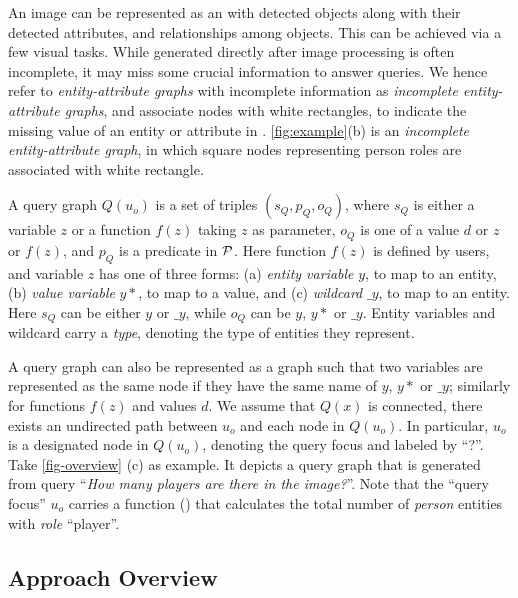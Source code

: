 An image can be represented as an  with detected objects along with their detected attributes, and relationships among objects. This can be achieved via a few visual tasks. While  generated directly after image processing is often incomplete, \ie it may miss some crucial information to answer queries. We hence refer to {\em entity-attribute graphs} with incomplete information as {\em incomplete entity-attribute graphs}, and associate nodes with white rectangles, to indicate the missing value of an entity or attribute in . \cref{fig:example}(b) is an {\em incomplete entity-attribute graph}, in which square nodes representing person roles are associated with white rectangle. 

  A query graph $Q(u_o)$ is a set of triples
$(s_Q, p_Q, o_Q)$, where $s_Q$ is either a variable $z$ or a function $f(z)$ taking $z$ as parameter, $o_Q$ is one of a value $d$ or $z$ or $f(z)$, and $p_Q$ is a predicate in ${\cal P}$. Here function $f(z)$ is defined by users, and variable $z$ has one
of three forms: (a) {\em entity variable} $y$, to map to an entity, (b)
{\em value variable} $y*$, to map to a value, and (c) {\em wildcard} $\_y$, to
map to an entity. Here $s_Q$ can be either $y$ or $\_y$, while $o_Q$ can
be $y$, $y*$ or $\_y$. Entity variables and wildcard carry a {\em type},
denoting the type of entities they represent. 

A query graph can also be represented as a graph such
that two variables are represented as the same node if they
have the same name of $y$, $y*$ or $\_y$; similarly for functions $f(z)$ and values $d$.
We assume \kwlog that $Q(x)$ is connected, \ie there exists
an undirected path between $u_o$ and each node in $Q(u_o)$.
In particular, $u_o$ is a designated node in $Q(u_o)$, denoting the query focus and labeled by ``?''. %
Take \cref{fig-overview} (c) as example. It depicts a query graph that is generated from query ``{\em How many players are there in the image?}''. Note that the ``query focus'' $u_o$ carries a function () that calculates the total number of {\em person} entities with {\em role} ``player''. 


\subsection{Approach Overview}
\label{sec-architecture}




